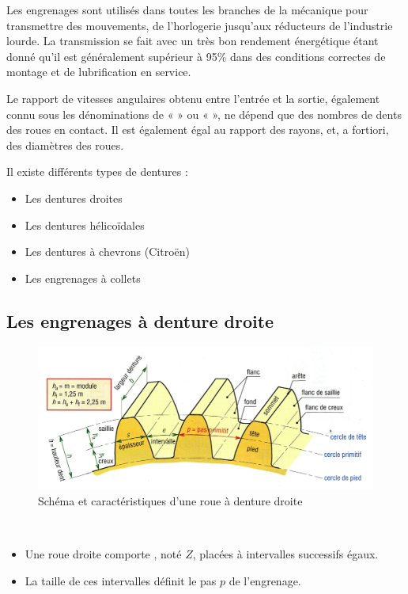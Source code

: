 \documentclass[10pt,fleqn]{article} %
\begin{document}
Les engrenages sont utilisés dans toutes les branches de la mécanique pour transmettre des mouvements, de l’horlogerie jusqu’aux réducteurs de l’industrie lourde. La transmission se fait avec un très bon rendement énergétique étant donné qu'il est généralement supérieur à 95\% dans des conditions correctes de montage et de lubrification en service.

\begin{aretenir}
  Le rapport de vitesses angulaires obtenu entre l’entrée et la sortie, également connu sous les dénominations de «  » ou «  », ne dépend que des nombres de dents des roues en contact. Il est également égal au rapport des rayons, et, a fortiori, des diamètres des roues.
\end{aretenir}

Il existe différents types de dentures :
\begin{itemize}
  \item Les dentures droites
  \item Les dentures hélicoïdales
  \item Les dentures à chevrons (Citroën)
  \item Les engrenages à collets
\end{itemize}

\subsection{Les engrenages à denture droite}
\begin{figure}[h]
  \includegraphics[width=\textwidth]{images/carac_engre}
  \caption{Schéma et caractéristiques d'une roue à denture droite}
  \label{fig:droite}
\end{figure}

\begin{aretenir}~\\
  \begin{itemize}
    \item Une roue droite comporte , noté $Z$, placées à intervalles successifs égaux.
    \item La taille de ces intervalles définit le pas $p$ de l'engrenage.
  \end{itemize}
\end{aretenir}
\end{document}

